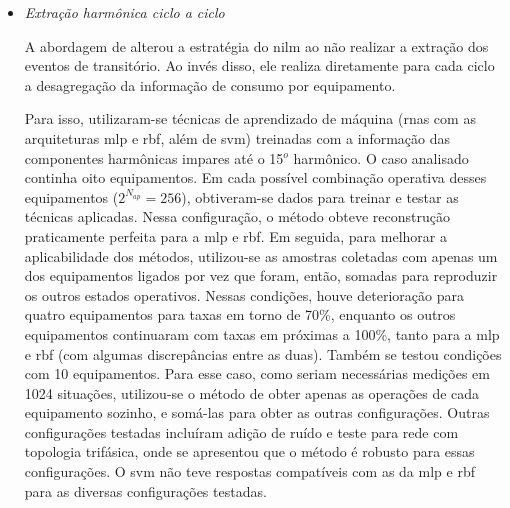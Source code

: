 \begin{enumerate}[label=\textbf{2.\arabic*},wide=\parindent]
\begin{itemize}[wide=\parindent]
\item \emph{Extração harmônica ciclo a ciclo}
\label{nilm:harmonico_ciclo_ciclo}

A abordagem de \citet{nilm_srinivasan_nn_2006_27} alterou a estratégia
do \gls{nilm} ao não realizar a extração dos eventos de transitório.
Ao invés disso, ele realiza diretamente para cada ciclo a desagregação
da informação de consumo por equipamento.

Para isso, utilizaram-se técnicas de aprendizado
de máquina (\glspl{rna} com as arquiteturas \acs{mlp} e
\acs{rbf}, além de \acs{svm}) treinadas com a informação das
componentes harmônicas impares até o 15$^o$ harmônico. O caso
analisado continha oito equipamentos. Em cada possível combinação
operativa desses equipamentos ($2^{N_{ap}}=256$), obtiveram-se dados para
treinar e testar as técnicas aplicadas. Nessa configuração, o método
obteve reconstrução praticamente perfeita para a \gls{mlp} e
\gls{rbf}. Em seguida, para melhorar a aplicabilidade dos métodos,
utilizou-se as amostras coletadas com apenas um dos equipamentos ligados
por vez que foram, então, somadas para reproduzir os outros estados
operativos. Nessas condições, houve deterioração para quatro
equipamentos para taxas em torno de 70\%, enquanto os outros equipamentos
continuaram com taxas em próximas a 100\%, tanto para a \gls{mlp} e
\gls{rbf} (com algumas discrepâncias entre as duas). Também se testou
condições com 10 equipamentos. Para esse caso, como seriam necessárias
medições em 1024 situações, utilizou-se o método de obter apenas as
operações de cada equipamento sozinho, e somá-las para obter as outras
configurações. Outras configurações testadas incluíram adição de
ruído e teste para rede com topologia trifásica, onde se apresentou
que o método é robusto para essas configurações. O \gls{svm} não teve
respostas compatíveis com as da \gls{mlp} e \gls{rbf} para as diversas
configurações testadas.


\end{itemize}
\end{enumerate}
